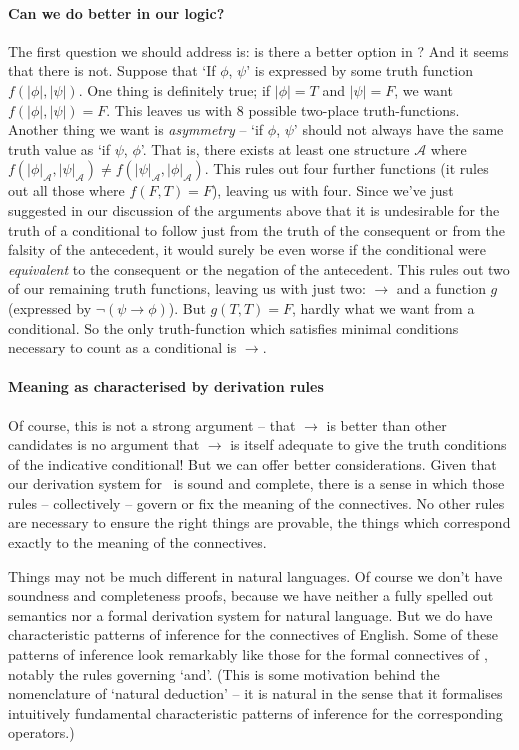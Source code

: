 \paragraph{Can we do better in our logic?}
The first question we should address is: is there a better option in \lone? And it seems that there is not. Suppose that `If $\phi$, $\psi$' is expressed by some truth function $f(|\phi|,|\psi|)$. One thing is definitely true; if $|\phi|=T$ and $|\psi|=F$, we want $f(|\phi|,|\psi|)=F$. This leaves us with 8 possible two-place truth-functions. Another thing we want is \emph{asymmetry} – `if $\phi$, $\psi$' should not always have the same truth value as `if $\psi$, $\phi$'. That is, there exists at least one structure $\mathscr{A}$ where $f(|\phi|_{\mathscr{A}},|\psi|_{\mathscr{A}})\neq f(|\psi|_{\mathscr{A}},|\phi|_{\mathscr{A}})$. This rules out four further functions (it rules out all those where $f(F,T)=F$), leaving us with four. Since we've just suggested in our discussion of the arguments above that it is undesirable for the truth of a conditional to follow just from the truth of the consequent or from the falsity of the antecedent, it would surely be even worse if the conditional were \emph{equivalent} to the consequent or the negation of the antecedent. This rules out two of our remaining truth functions, leaving us with just two: $\to$ and a function $g$ (expressed by $\neg(\psi\to\phi)$). But $g(T,T)=F$, hardly what we want from a conditional. So the only truth-function which satisfies minimal conditions necessary to count as a conditional is $\to$.

\paragraph{Meaning as characterised by derivation rules}
Of course, this is not a strong argument – that $\to$ is better than other candidates is no argument that $\to$ is itself adequate to give the truth conditions of the indicative conditional! But we can offer better considerations. Given that our derivation system for \lone\ is sound and complete, there is a sense in which those rules – collectively – govern or fix the meaning of the connectives. No other rules are necessary to ensure the right things are provable, the things which correspond exactly to the meaning of the connectives.

Things may not be much different in natural languages. Of course we don't have soundness and completeness proofs, because we have neither a fully spelled out semantics nor a formal derivation system for natural language. But we do have characteristic patterns of inference for the connectives of English. Some of these patterns of inference look remarkably like those for the formal connectives of \lone, notably the rules governing `and'. (This is some motivation behind the nomenclature of `natural deduction' – it is natural in the sense that it formalises intuitively fundamental characteristic patterns of inference for the corresponding operators.)

